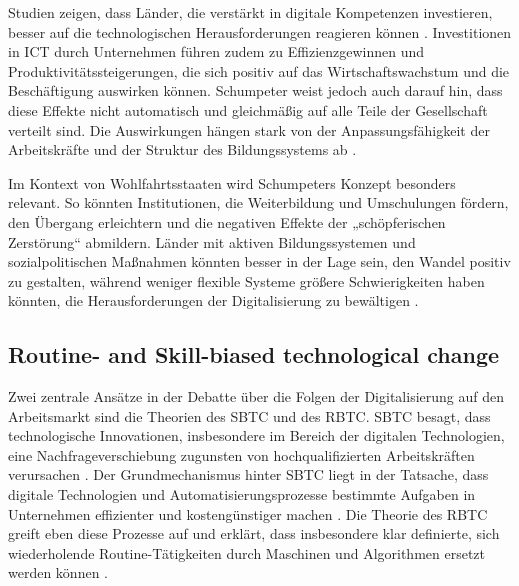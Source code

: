 Studien zeigen, dass Länder, die verstärkt in digitale Kompetenzen investieren, besser auf die 
technologischen Herausforderungen reagieren können \parencite[S. 15–17]{oecd2019measuring}. 
Investitionen in \ac{ICT} durch Unternehmen führen zudem zu Effizienzgewinnen und 
Produktivitätssteigerungen, die sich positiv auf das Wirtschaftswachstum und die Beschäftigung 
auswirken können. Schumpeter weist jedoch auch darauf hin, dass diese Effekte nicht automatisch 
und gleichmäßig auf alle Teile der Gesellschaft verteilt sind. Die Auswirkungen hängen stark von 
der Anpassungsfähigkeit der Arbeitskräfte und der Struktur des Bildungssystems ab 
\parencite[S. 48]{oecd2019measuring}.

Im Kontext von Wohlfahrtsstaaten wird Schumpeters Konzept besonders relevant. So könnten 
Institutionen, die Weiterbildung und Umschulungen fördern, den Übergang erleichtern und die 
negativen Effekte der „schöpferischen Zerstörung“ abmildern. Länder mit aktiven Bildungssystemen 
und sozialpolitischen Maßnahmen könnten besser in der Lage sein, den Wandel positiv zu gestalten, 
während weniger flexible Systeme größere Schwierigkeiten haben könnten, die Herausforderungen der 
Digitalisierung zu bewältigen \parencite[vgl.][S. 29–31]{espingandersen1990thethree}.


\subsection{Routine- and Skill-biased technological change}

Zwei zentrale Ansätze in der Debatte über die Folgen der Digitalisierung auf den Arbeitsmarkt 
sind die Theorien des \ac{SBTC} und des \ac{RBTC}. \ac{SBTC} besagt, dass technologische 
Innovationen, insbesondere im Bereich der digitalen Technologien, eine Nachfrageverschiebung 
zugunsten von hochqualifizierten Arbeitskräften verursachen 
\parencite[vgl.][S. 1]{violante2008skill}. Der Grundmechanismus hinter \ac{SBTC} liegt in der 
Tatsache, dass digitale Technologien und Automatisierungsprozesse bestimmte Aufgaben in 
Unternehmen effizienter und kostengünstiger machen \parencite[vgl.][S. 2–3]{violante2008skill}. 
Die Theorie des \ac{RBTC} greift eben diese Prozesse auf und erklärt, dass insbesondere klar 
definierte, sich wiederholende Routine-Tätigkeiten durch Maschinen und Algorithmen ersetzt werden 
können \parencite[vgl.][S. 2509–2510]{goos2014explaining}.

